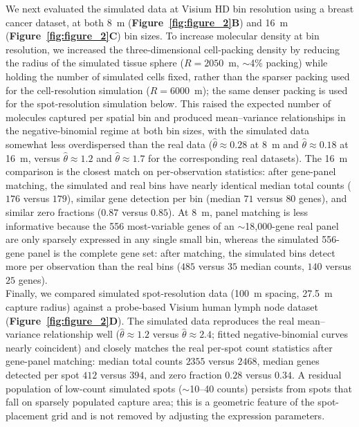 We next evaluated the simulated data at Visium HD bin resolution using a breast cancer dataset, at both 8~\textmu m (\textbf{Figure~\ref{fig:figure_2}B}) and 16~\textmu m (\textbf{Figure~\ref{fig:figure_2}C}) bin sizes. To increase molecular density at bin resolution, we increased the three-dimensional cell-packing density by reducing the radius of the simulated tissue sphere ($R=2050$~\textmu m, $\sim$4\% packing) while holding the number of simulated cells fixed, rather than the sparser packing used for the cell-resolution simulation ($R=6000$~\textmu m); the same denser packing is used for the spot-resolution simulation below. This raised the expected number of molecules captured per spatial bin and produced mean--variance relationships in the negative-binomial regime at both bin sizes, with the simulated data somewhat less overdispersed than the real data ($\hat{\theta}\approx 0.28$ at 8~\textmu m and $\hat{\theta}\approx 0.18$ at 16~\textmu m, versus $\hat{\theta}\approx 1.2$ and $\hat{\theta}\approx 1.7$ for the corresponding real datasets). The 16~\textmu m comparison is the closest match on per-observation statistics: after gene-panel matching, the simulated and real bins have nearly identical median total counts ($176$ versus $179$), similar gene detection per bin (median $71$ versus $80$ genes), and similar zero fractions ($0.87$ versus $0.85$). At 8~\textmu m, panel matching is less informative because the 556 most-variable genes of an $\sim$18{,}000-gene real panel are only sparsely expressed in any single small bin, whereas the simulated 556-gene panel is the complete gene set: after matching, the simulated bins detect more per observation than the real bins ($485$ versus $35$ median counts, $140$ versus $25$ genes). \\

Finally, we compared simulated spot-resolution data (100~\textmu m spacing, 27.5~\textmu m capture radius) against a probe-based Visium human lymph node dataset (\textbf{Figure~\ref{fig:figure_2}D}). The simulated data reproduces the real mean--variance relationship well ($\hat{\theta}\approx 1.2$ versus $\hat{\theta}\approx 2.4$; fitted negative-binomial curves nearly coincident) and closely matches the real per-spot count statistics after gene-panel matching: median total counts $2355$ versus $2468$, median genes detected per spot $412$ versus $394$, and zero fraction $0.28$ versus $0.34$. A residual population of low-count simulated spots ($\sim$10--40 counts) persists from spots that fall on sparsely populated capture area; this is a geometric feature of the spot-placement grid and is not removed by adjusting the expression parameters. \\

